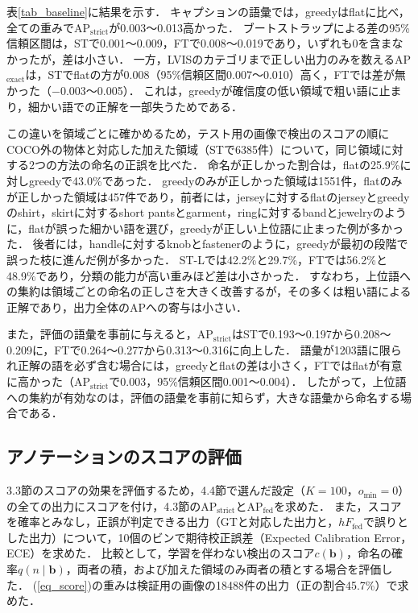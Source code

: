 表\ref{tab_baseline}に結果を示す．
キャプションの語彙では，greedyはflatに比べ，全ての重みでAP$ _{\mathrm{strict}} $が0.003〜0.013高かった．
ブートストラップによる差の95\%信頼区間は，STで0.001〜0.009，FTで0.008〜0.019であり，いずれも0を含まなかったが，差は小さい．
一方，LVISのカテゴリまで正しい出力のみを数えるAP$ _{\mathrm{exact}} $は，STでflatの方が0.008（95\%信頼区間0.007〜0.010）高く，FTでは差が無かった（$-0.003$〜0.005）．
これは，greedyが確信度の低い領域で粗い語に止まり，細かい語での正解を一部失うためである．

この違いを領域ごとに確かめるため，テスト用の画像で検出のスコアの順にCOCO外の物体と対応した加えた領域（STで6385件）について，同じ領域に対する2つの方法の命名の正誤を比べた．
命名が正しかった割合は，flatの25.9\%に対しgreedyで43.0\%であった．
greedyのみが正しかった領域は1551件，flatのみが正しかった領域は457件であり，前者には，jerseyに対するflatのjerseyとgreedyのshirt，skirtに対するshort pantsとgarment，ringに対するbandとjewelryのように，flatが誤った細かい語を選び，greedyが正しい上位語に止まった例が多かった．
後者には，handleに対するknobとfastenerのように，greedyが最初の段階で誤った枝に進んだ例が多かった．
ST-Lでは42.2\%と29.7\%，FTでは56.2\%と48.9\%であり，分類の能力が高い重みほど差は小さかった．
すなわち，上位語への集約は領域ごとの命名の正しさを大きく改善するが，その多くは粗い語による正解であり，出力全体のAPへの寄与は小さい．

また，評価の語彙を事前に与えると，AP$ _{\mathrm{strict}} $はSTで0.193〜0.197から0.208〜0.209に，FTで0.264〜0.277から0.313〜0.316に向上した．
語彙が1203語に限られ正解の語を必ず含む場合には，greedyとflatの差は小さく，FTではflatが有意に高かった（AP$ _{\mathrm{strict}} $で0.003，95\%信頼区間0.001〜0.004）．
したがって，上位語への集約が有効なのは，評価の語彙を事前に知らず，大きな語彙から命名する場合である．

\subsection{アノテーションのスコアの評価}
3.3節のスコアの効果を評価するため，4.4節で選んだ設定（$ K = 100 $，$ o_{\min} = 0 $）の全ての出力にスコアを付け，4.3節のAP$ _{\mathrm{strict}} $とAP$ _{\mathrm{fed}} $を求めた．
また，スコアを確率とみなし，正誤が判定できる出力（GTと対応した出力と，$ hF_{\mathrm{fed}} $で誤りとした出力）について，10個のビンで期待校正誤差（Expected Calibration Error，ECE）\cite{ref_Calibration}を求めた．
比較として，学習を伴わない検出のスコア$ c({\mathbf b}) $，命名の確率$ q(n \mid {\mathbf b}) $，両者の積，および加えた領域のみ両者の積とする場合を評価した．
(\ref{eq_score})の重みは検証用の画像の18488件の出力（正の割合45.7\%）で求めた．

